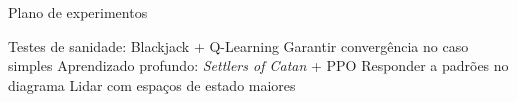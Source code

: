 \documentclass[aspectratio=169]{beamer}
\begin{document}
\begin{frame}{Plano de experimentos}
    \begin{outline}
	\1 Testes de sanidade: Blackjack + Q-Learning
	    \2 Garantir convergência no caso simples
	\vspace{0.25cm}
	\1 Aprendizado profundo: \textit{Settlers of Catan} + PPO
	    \2 Responder a padrões no diagrama %
	    \2 Lidar com espaços de estado maiores %
    \end{outline}
\end{frame}

\begin{frame}
    \printbibliography
\end{frame}
\end{document}
